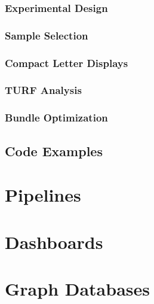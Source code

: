 \documentclass[
]{book}
\begin{document}
\hypertarget{experimental-design}{%
\subsection{Experimental Design}\label{experimental-design}}

\hypertarget{sample-selection}{%
\subsection{Sample Selection}\label{sample-selection}}

\hypertarget{compact-letter-displays}{%
\subsection{Compact Letter Displays}\label{compact-letter-displays}}

\hypertarget{turf-analysis}{%
\subsection{TURF Analysis}\label{turf-analysis}}

\hypertarget{bundle-optimization}{%
\subsection{Bundle Optimization}\label{bundle-optimization}}

\hypertarget{code-examples-2}{%
\section{Code Examples}\label{code-examples-2}}

\hypertarget{pipelines}{%
\chapter{Pipelines}\label{pipelines}}

\hypertarget{dashboards}{%
\chapter{Dashboards}\label{dashboards}}

\hypertarget{graph-db}{%
\chapter{Graph Databases}\label{graph-db}}

\hypertarget{appendix-uxe0-la-carte}{%
\appendix}
\end{document}
